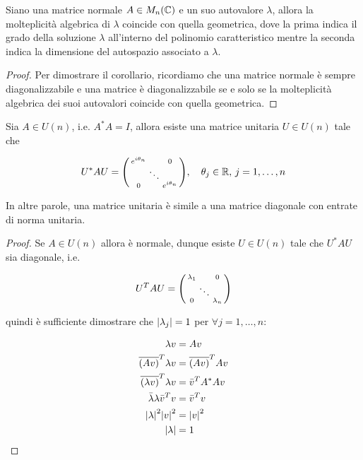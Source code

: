 \begin{corollary}[2]
	Siano una matrice normale $ A \in M_{n}(\mathbb{C}) $ e un suo autovalore $ \lambda $, allora la molteplicità algebrica di $ \lambda $ coincide con quella geometrica, dove la prima indica il grado della soluzione $ \lambda $ all'interno del polinomio caratteristico mentre la seconda indica la dimensione del autospazio associato a $ \lambda $.
\end{corollary}

\begin{proof}
	Per dimostrare il corollario, ricordiamo che una matrice normale è sempre diagonalizzabile e una matrice è diagonalizzabile se e solo se la molteplicità algebrica dei suoi autovalori coincide con quella geometrica.
\end{proof}

\begin{corollary}[3]
	Sia $ A \in U(n) $, i.e. $ A^{*} A = I $, allora esiste una matrice unitaria $ U \in U(n) $ tale che
	
	\begin{equation}
		U^{*} A U = %
		\smqty(\dmat{ e^{i \theta_{n}} & & 0 \\ & \ddots & \\ 0 & & e^{i \theta_{n}} }) \qcomma \theta_{j} \in \R, \, j=1,\dots,n
	\end{equation}

	In altre parole, una matrice unitaria è simile a una matrice diagonale con entrate di norma unitaria.
\end{corollary}

\begin{proof}
	Se $ A \in U(n) $ allora è normale, dunque esiste $ U \in U(n) $ tale che $ U^{*} A U $ sia diagonale, i.e.
	
	\begin{equation}
		U^{T} A U = %
		\smqty(\dmat{\lambda_{1} & & 0 \\ & \ddots & \\ 0 & & \lambda_{n}})
	\end{equation}

	quindi è sufficiente dimostrare che $ \abs{\lambda_{j}} = 1 $ per $ \forall j=1,\dots,n $:
	
	\begin{align}
		\begin{split}
			\lambda v &= A v\\
			\overline{(A v)}^{T} \lambda v &= \overline{(A v)}^{T} A v\\
			\overline{(\lambda v)}^{T} \lambda v &= \bar{v}^{T} A^{*} A v\\
			\bar{\lambda} \lambda \bar{v}^{T} v &= \bar{v}^{T} v\\
			\abs{\lambda}^{2} \abs{v}^{2} &= \abs{v}^{2}\\
			\abs{\lambda} &= 1
		\end{split}
	\end{align}
\end{proof}

